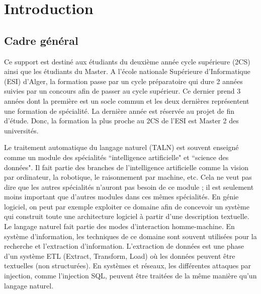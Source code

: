 \documentclass{KodeBook}
\begin{document}
		\mainmatter
	
\fi

\chapter*{Introduction}


\section*{Cadre général}

Ce support est destiné aux étudiants du deuxième année cycle supérieure (2CS) ainsi que les étudiants du Master.
A l'école nationale Supérieure d'Informatique (ESI) d'Alger, la formation passe par un cycle préparatoire qui dure
2 années suivies par un concours afin de passer au cycle supérieur.
Ce dernier prend 3 années dont la première est un socle commun et les deux dernières représentent une formation de spécialité.
La dernière année est réservée au projet de fin d'étude.
Donc, la formation la plus proche au 2CS de l'ESI est Master 2 des universités.

Le traitement automatique du langage naturel (TALN) est souvent enseigné comme un module des spécialités ``intelligence artificielle" et ``science des données".
Il fait partie des branches de l'intelligence artificielle comme la vision par ordinateur, la robotique, le raisonnement par machine, etc.
Cela ne veut pas dire que les autres spécialités n'auront pas besoin de ce module ; il est seulement moins important que d'autres modules dans ces mêmes spécialités.
En génie logiciel, on peut par exemple exploiter ce domaine afin de concevoir un système qui construit toute une architecture logiciel à partir d'une description textuelle.
Le langage naturel fait partie des modes d'interaction homme-machine.
En système d'information, les techniques de ce domaine sont souvent utilisées pour la recherche et l'extraction d'information.
L'extraction de données est une phase d'un système ETL (Extract, Transform, Load) où les données peuvent être textuelles (non structurées).
En systèmes et réseaux, les différentes attaques par injection, comme l'injection SQL, peuvent être traitées de la même manière qu'un langage naturel.
\end{document}
